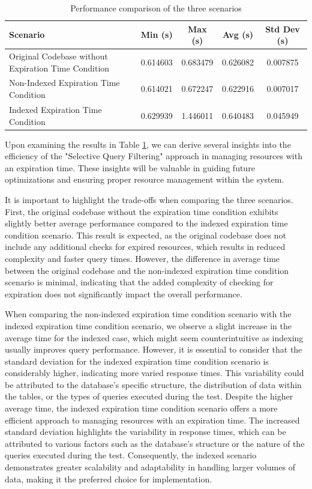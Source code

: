 \documentclass[a4paper,fleqn]{cas-dc}
\begin{document}
\begin{table}[htbp]
\centering
\caption{Performance comparison of the three scenarios}
\begin{tabular}{lcccc}
\hline
Scenario & Min (s) & Max (s) & Avg (s) & Std Dev (s) \\ \hline
Original Codebase without Expiration Time Condition & 0.614603 & 0.683479 & 0.626082 & 0.007875 \\
Non-Indexed Expiration Time Condition & 0.614021 & 0.672247 & 0.622916 & 0.007017 \\
Indexed Expiration Time Condition & 0.629939 & 1.446011 & 0.640483 & 0.045949 \\ \hline
\end{tabular}
\label{tab:performance_comparison}
\end{table}

Upon examining the results in Table \ref{tab:performance_comparison}, we can derive several insights into the efficiency of the "Selective Query Filtering" approach in managing resources with an expiration time. These insights will be valuable in guiding future optimizations and ensuring proper resource management within the system.

It is important to highlight the trade-offs when comparing the three scenarios. First, the original codebase without the expiration time condition exhibits slightly better average performance compared to the indexed expiration time condition scenario. This result is expected, as the original codebase does not include any additional checks for expired resources, which results in reduced complexity and faster query times. However, the difference in average time between the original codebase and the non-indexed expiration time condition scenario is minimal, indicating that the added complexity of checking for expiration does not significantly impact the overall performance.

When comparing the non-indexed expiration time condition scenario with the indexed expiration time condition scenario, we observe a slight increase in the average time for the indexed case, which might seem counterintuitive as indexing usually improves query performance. However, it is essential to consider that the standard deviation for the indexed expiration time condition scenario is considerably higher, indicating more varied response times. This variability could be attributed to the database's specific structure, the distribution of data within the tables, or the types of queries executed during the test. Despite the higher average time, the indexed expiration time condition scenario offers a more efficient approach to managing resources with an expiration time. The increased standard deviation highlights the variability in response times, which can be attributed to various factors such as the database's structure or the nature of the queries executed during the test. Consequently, the indexed scenario demonstrates greater scalability and adaptability in handling larger volumes of data, making it the preferred choice for implementation.
\end{document}
